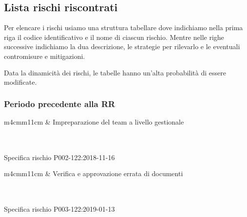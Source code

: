 	\subsection{Lista rischi riscontrati}

	Per elencare i rischi usiamo una struttura tabellare dove indichiamo nella prima riga il codice identificativo e il nome di ciascun rischio. Mentre nelle righe successive indichiamo la dua descrizione, le strategie per rilevarlo e le eventuali contromisure e mitigazioni.\par
    
    Data la dinamicità dei rischi, le tabelle hanno un'alta probabilità di essere modificate.

	\subsubsection{Periodo precedente alla RR}

	\begin{table}[H]
		\begin{risktable}{\columnwidth}{m{4cm}m{11cm}}
			 &
			Impreparazione del team a livello gestionale \\
			\rowcolor{\tablegray}
			\\
			\\
		\end{risktable}
		\caption{Specifica rischio P002-122:2018-11-16}
	\end{table}
	
	\mydoublerule{\linewidth}{0pt}{2pt}
	
	\begin{table}[H]
		\begin{risktable}{\columnwidth}{m{4cm}m{11cm}}
			 &
			Verifica e approvazione errata di documenti \\
			\rowcolor{\tablegray}
			\\
			\\
		\end{risktable}
		\caption{Specifica rischio P003-122:2019-01-13}
	\end{table}

